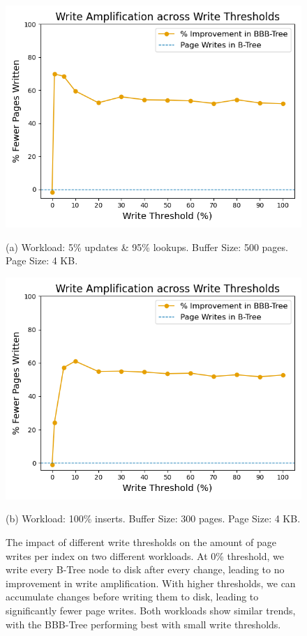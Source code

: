 \begin{figure}[ht]
  \centering
  \begin{minipage}{0.48\textwidth}
    \centering
    \includegraphics[width=\textwidth]{figures/evaluation/pageviews_write_thresholds_improvement.png}
    \caption*{(a) Workload: 5\% updates \& 95\% lookups. Buffer Size: 500 pages. Page Size: 4 KB.}
  \end{minipage}\hfill
  \begin{minipage}{0.48\textwidth}
    \centering
  \includegraphics[width=\textwidth]{figures/evaluation/pageviews_write_thresholds_improvement_inserts.png}
    \caption*{(b) Workload: 100\% inserts. Buffer Size: 300 pages. Page Size: 4 KB.}
  \end{minipage}
  \caption{The impact of different write thresholds on the amount of page writes per index on two different workloads. At 0\% threshold, we write every B-Tree node to disk after every change, leading to no improvement in write amplification. With higher thresholds, we can accumulate changes before writing them to disk, leading to significantly fewer page writes. Both workloads show similar trends, with the BBB-Tree performing best with small write thresholds.}
  \label{fig:write_thresholds_improvement}
\end{figure}

